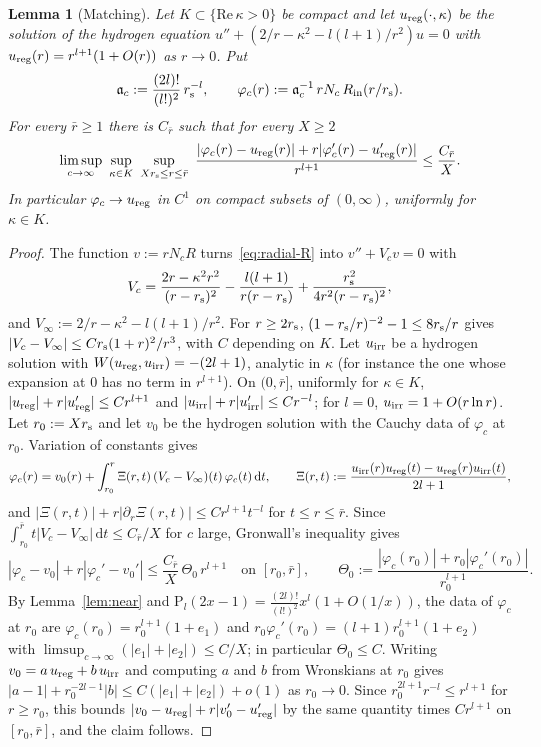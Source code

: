 \documentclass[%
 aip,
 jmp,
 amsmath,amssymb,
 reprint, onecolumn
]{revtex4-1}
\newtheorem{alemma}{Lemma}
\theoremstyle{definition}
\theoremstyle{remark}
\newcommand{\rmd}{\mathrm{d}}
\begin{document}
\begin{alemma}[Matching]\label{lem:matching}
Let $K\subset\{\mathrm{Re}\,\kappa>0\}$ be compact and let
$u_{\rm reg}(\cdot,\kappa)$ be the solution of the hydrogen equation
$u''+(2/r-\kappa^2-l(l+1)/r^2)u=0$ with $u_{\rm reg}(r)=r^{l+1}(1+O(r))$ as
$r\to0$. Put
\[
\mathfrak a_c:=\frac{(2l)!}{(l!)^2}\,r_{\rm s}^{-l},\qquad
\varphi_c(r):=\mathfrak a_c^{-1}\,rN_c\,R_{\rm in}(r/r_{\rm s}) .
\]
For every $\bar r\geq1$ there is $C_{\bar r}$ such that for every $X\geq2$
\[
\limsup_{c\to\infty}\ \sup_{\kappa\in K}\ \sup_{Xr_{\rm s}\leq r\leq\bar r}
\ \frac{|\varphi_c(r)-u_{\rm reg}(r)|+r|\varphi_c'(r)-u_{\rm reg}'(r)|}
{r^{l+1}}\leq\frac{C_{\bar r}}{X}.
\]
In particular $\varphi_c\to u_{\rm reg}$ in $C^1$ on compact subsets of
$(0,\infty)$, uniformly for $\kappa\in K$.
\end{alemma}

\begin{proof}
The function $v:=rN_cR$ turns~\eqref{eq:radial-R} into
$v''+V_cv=0$ with
\[
V_c=\frac{2r-\kappa^2r^2}{(r-r_{\rm s})^2}-\frac{l(l+1)}{r(r-r_{\rm s})}
+\frac{r_{\rm s}^2}{4r^2(r-r_{\rm s})^2},
\]
and $V_\infty:=2/r-\kappa^2-l(l+1)/r^2$. For $r\geq2r_{\rm s}$,
$(1-r_{\rm s}/r)^{-2}-1\leq8r_{\rm s}/r$ gives
$|V_c-V_\infty|\leq Cr_{\rm s}(1+r)^2/r^3$, with $C$ depending on $K$. Let
$u_{\rm irr}$ be a hydrogen solution with
$W(u_{\rm reg},u_{\rm irr})=-(2l+1)$, analytic in $\kappa$ (for instance
the one whose expansion at $0$ has no term in $r^{l+1}$). On $(0,\bar r]$, uniformly for
$\kappa\in K$, $|u_{\rm reg}|+r|u_{\rm reg}'|\leq Cr^{l+1}$ and
$|u_{\rm irr}|+r|u_{\rm irr}'|\leq Cr^{-l}$; for $l=0$,
$u_{\rm irr}=1+O(r\ln r)$. Let $r_0:=Xr_{\rm s}$ and let $v_0$ be the
hydrogen solution with the Cauchy data of $\varphi_c$ at $r_0$. Variation
of constants gives
\[
\varphi_c(r)=v_0(r)+\int_{r_0}^r\Xi(r,t)\,(V_c-V_\infty)(t)\,
\varphi_c(t)\,\rmd t,\qquad
\Xi(r,t):=\frac{u_{\rm irr}(r)u_{\rm reg}(t)-u_{\rm reg}(r)u_{\rm irr}(t)}
{2l+1},
\]
and $|\Xi(r,t)|+r|\partial_r\Xi(r,t)|\leq Cr^{l+1}t^{-l}$ for
$t\leq r\leq\bar r$. Since $\int_{r_0}^{\bar r} t|V_c-V_\infty|\,\rmd t\leq
C_{\bar r}/X$ for $c$ large, Gronwall's inequality gives
\[
|\varphi_c-v_0|+r|\varphi_c'-v_0'|\leq\frac{C_{\bar r}}{X}\,\Theta_0\,r^{l+1}
\quad\text{on }[r_0,\bar r],\qquad
\Theta_0:=\frac{|\varphi_c(r_0)|+r_0|\varphi_c'(r_0)|}{r_0^{l+1}} .
\]
By Lemma~\ref{lem:near} and
$\mathrm P_l(2x-1)=\frac{(2l)!}{(l!)^2}x^l(1+O(1/x))$, the data of
$\varphi_c$ at $r_0$ are $\varphi_c(r_0)=r_0^{l+1}(1+e_1)$ and
$r_0\varphi_c'(r_0)=(l+1)r_0^{l+1}(1+e_2)$ with
$\limsup_{c\to\infty}(|e_1|+|e_2|)\leq C/X$; in particular
$\Theta_0\leq C$. Writing $v_0=a\,u_{\rm reg}+b\,u_{\rm irr}$ and computing
$a$ and $b$ from Wronskians at $r_0$ gives $|a-1|+r_0^{-2l-1}|b|\leq
C(|e_1|+|e_2|)+o(1)$ as $r_0\to0$. Since
$r_0^{2l+1}r^{-l}\leq r^{l+1}$ for $r\geq r_0$, this bounds
$|v_0-u_{\rm reg}|+r|v_0'-u_{\rm reg}'|$ by the same quantity times
$Cr^{l+1}$ on $[r_0,\bar r]$, and the claim follows.
\end{proof}
\end{document}
